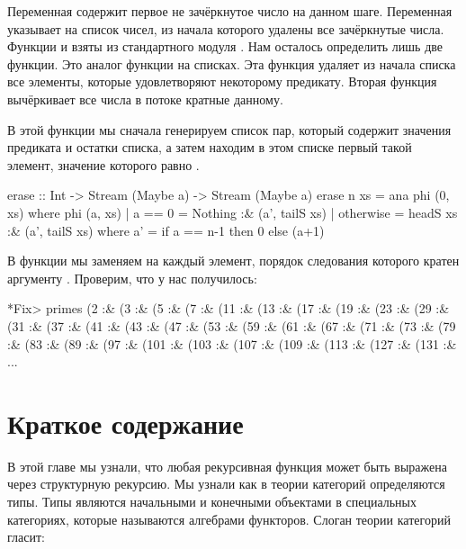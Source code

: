 Переменная  содержит первое не зачёркнутое число на данном шаге.
Переменная  указывает на список чисел, из начала которого удалены
все зачёркнутые числа. Функции  и  взяты из
стандартного модуля . Нам осталось определить лишь две
функции. Это аналог функции  на списках. Эта функция
удаляет из начала списка все элементы, которые удовлетворяют некоторому
предикату. Вторая функция  вычёркивает все числа в потоке
кратные данному.



В этой функции мы сначала генерируем список пар, который содержит
значения предиката и остатки списка, а затем находим в этом списке
первый такой элемент, значение которого равно .


\begin{code}
erase :: Int -> Stream (Maybe a) -> Stream (Maybe a)
erase n xs = ana phi (0, xs)
    where phi (a, xs) 
            | a == 0    = Nothing  :& (a', tailS xs)
            | otherwise = headS xs :& (a', tailS xs)
            where a' = if a == n-1 then 0 else (a+1)
\end{code}

В функции  мы заменяем на  каждый элемент, порядок
следования которого кратен аргументу . Проверим, что у нас
получилось:


\begin{code}
*Fix> primes 
(2 :& (3 :& (5 :& (7 :& (11 :& (13 :& (17 :& (19 :& (23 :& 
(29 :& (31 :& (37 :& (41 :& (43 :& (47 :& (53 :& (59 :& 
(61 :& (67 :& (71 :& (73 :& (79 :& (83 :& (89 :& (97 :& 
(101 :& (103 :& (107 :& (109 :& (113 :& (127 :& (131 :&
...
\end{code}

\section{Краткое содержание}

В этой главе мы узнали, что любая рекурсивная функция может быть
выражена через структурную рекурсию. Мы узнали как в теории категорий
определяются типы. Типы являются начальными и конечными объектами в
специальных категориях, которые называются алгебрами функторов. Слоган
теории категорий гласит:

